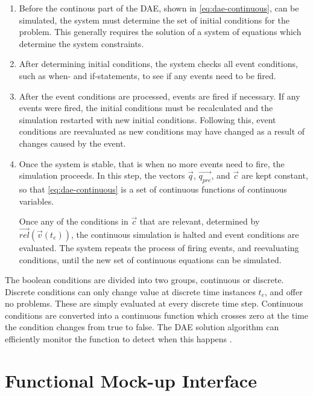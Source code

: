 \documentclass[\rootfolder/main.tex]{subfiles}
\begin{document}
\begin{enumerate}
    \item Before the continous part of the DAE, shown in \cref{eq:dae-continuous}, can be simulated, the system must determine the set of initial conditions for the problem.
	This generally requires the solution of a system of equations which determine the system constraints.

    \item After determining initial conditions, the system checks all event conditions, such as when- and if-statements, to see if any events need to be fired.

    \item After the event conditions are processed, events are fired if necessary.
	If any events were fired, the initial conditions must be recalculated and the simulation restarted with new initial conditions.
	Following this, event conditions are reevaluated as new conditions may have changed as a result of changes caused by the event.

    \item Once the system is stable, that is when no more events need to fire, the simulation proceeds.
	In this step, the vectors $\vec{q}$, $\vec{q_{pre}}$, and $\vec{c}$ are kept constant, so that \cref{eq:dae-continuous} is a set of continuous functions of continuous variables.

	Once any of the conditions in $\vec{c}$ that are relevant, determined by $\vec{rel}(\vec{v}(t_{e}))$, the continuous simulation is halted and event conditions are evaluated.
	The system repeats the process of firing events, and reevaluating conditions, until the new set of continuous equations can be simulated.
\end{enumerate}

The boolean conditions are divided into two groups, continuous or discrete.
Discrete conditions can only change value at discrete time instances $t_{e}$, and offer no problems.
These are simply evaluated at every discrete time step.
Continuous conditions are converted into a continuous function which crosses zero at the time the condition changes from true to false.
The DAE solution algorithm can efficiently monitor the function to detect when this happens \cite{openmodelica.org:lundvall:sims:2005}.

\section{Functional Mock-up Interface}
\end{document}
